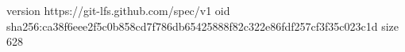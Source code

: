 version https://git-lfs.github.com/spec/v1
oid sha256:ca38f6eee2f5c0b858cd7f786db65425888f82c322e86fdf257cf3f35c023c1d
size 628
